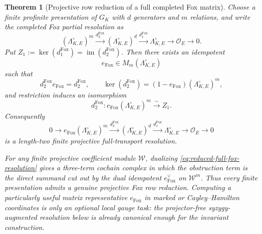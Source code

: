 \documentclass[11pt]{article}
\newtheorem{theorem}{Theorem}[section]
\theoremstyle{definition}
\begin{document}
\begin{theorem}[Projective row reduction of a full completed Fox matrix]\label{thm:full-fox-projector}
Choose a finite profinite presentation of $G_K$ with $d$ generators and $m$
relations, and write the completed Fox partial resolution as
\begin{equation}\label{eq:full-fox-partial-resolution}
 (\Lambda_{K,E}^{\circ})^m
 \xrightarrow{d_2^{\mathrm{Fox}}}
 (\Lambda_{K,E}^{\circ})^d
 \xrightarrow{d_1^{\mathrm{Fox}}}
 \Lambda_{K,E}^{\circ}
 \longrightarrow\mathcal O_E\longrightarrow0.
\end{equation}
Put $Z_1:=\ker(d_1^{\mathrm{Fox}})=\operatorname{im}(d_2^{\mathrm{Fox}})$.
Then there exists an idempotent
\[
 e_{\mathrm{Fox}}\in
 M_m(\Lambda_{K,E}^{\circ})
\]
such that
\begin{equation}\label{eq:fox-projector-identities}
 d_2^{\mathrm{Fox}}e_{\mathrm{Fox}}=d_2^{\mathrm{Fox}},
 \qquad
 \ker(d_2^{\mathrm{Fox}})
 =(1-e_{\mathrm{Fox}})(\Lambda_{K,E}^{\circ})^m,
\end{equation}
and restriction induces an isomorphism
\[
 d_2^{\mathrm{Fox}}:
 e_{\mathrm{Fox}}(\Lambda_{K,E}^{\circ})^m
 \xrightarrow{\sim} Z_1.
\]
Consequently
\begin{equation}\label{eq:reduced-full-fox-resolution}
0\longrightarrow
 e_{\mathrm{Fox}}(\Lambda_{K,E}^{\circ})^m
 \xrightarrow{d_2^{\mathrm{Fox}}}
 (\Lambda_{K,E}^{\circ})^d
 \xrightarrow{d_1^{\mathrm{Fox}}}
 \Lambda_{K,E}^{\circ}
 \longrightarrow\mathcal O_E\longrightarrow0
\end{equation}
is a length-two finite projective full-transport resolution.

For any finite projective coefficient module $\mathcal W$, dualizing
\eqref{eq:reduced-full-fox-resolution} gives a three-term cochain complex in
which the obstruction term is the direct summand cut out by the dual
idempotent $e_{\mathrm{Fox}}^{\vee}$ on $\mathcal W^m$.  Thus every finite presentation admits a genuine projective Fox row reduction.  Computing a particularly useful matrix representative $e_{\mathrm{Fox}}$ in marked or Cayley--Hamilton coordinates is only an optional local gauge task: the projector-free syzygy-augmented resolution below is already canonical enough for the invariant construction.
\end{theorem}
\end{document}
